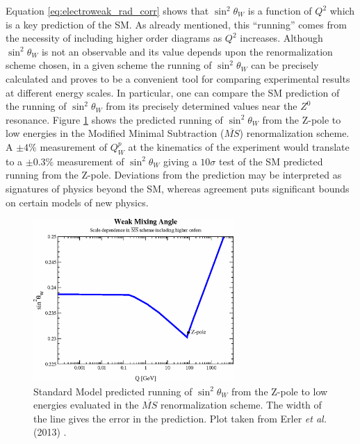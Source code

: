 Equation \ref{eq:electroweak_rad_corr} shows that $\sin^2\theta_W$ is a function of $Q^2$ which is a key prediction of the SM. As already mentioned, this ``running'' comes from the necessity of including higher order diagrams as $Q^2$ increases. Although $\sin^2\theta_W$ is not an observable and its value depends upon the renormalization scheme chosen, in a given scheme the running of $\sin^2\theta_W$ can be precisely calculated and proves to be a convenient tool for comparing experimental results at different energy scales. In particular, one can compare the SM prediction of the running of $\sin^2\theta_W$ from its precisely determined values near the $Z^0$ resonance. Figure \ref{fig:running_sine_squared_thetaW} shows the predicted running of $\sin^2\theta_W$ from the Z-pole to low energies in the  Modified Minimal Subtraction ($\overline{MS}$) renormalization scheme. A $\pm 4\%$ measurement of $Q_W^p$ at the kinematics of the \Qs experiment would translate to a $\pm 0.3\%$ measurement of $\sin^2\theta_W$ giving a $10\sigma$ test of the SM predicted running from the Z-pole. Deviations from the prediction may be interpreted as signatures of physics beyond the SM, whereas agreement puts significant bounds on certain models of new physics. 
 
\begin{figure}[ht]
\centering
\includegraphics[width=3.0in]{Pictures/running_sine_squared_thetaW.png}
\caption{Standard Model predicted running of $\sin^2\theta_W$ from the Z-pole to low energies evaluated in the $\overline{MS}$ renormalization scheme. The width of the line gives the error in the prediction. Plot taken from Erler {\it et al.} (2013) \cite{Musolf2005}.}
\label{fig:running_sine_squared_thetaW}
\end{figure}


